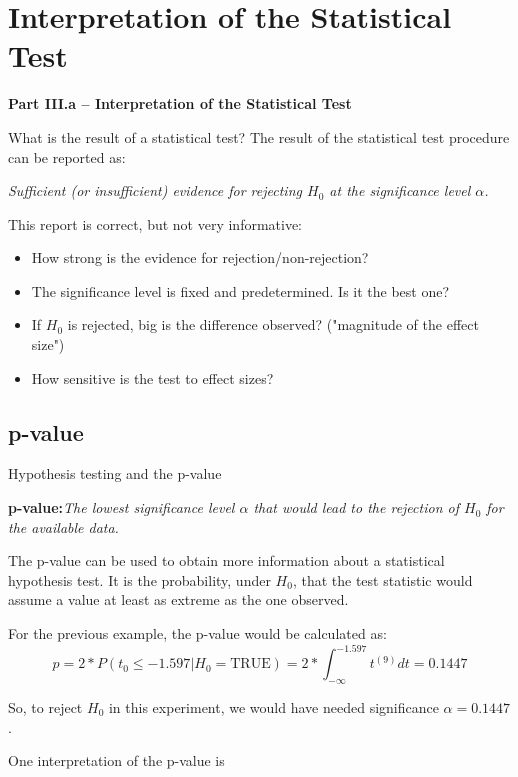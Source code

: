 \section{Interpretation of the Statistical Test}

\begin{frame}
  \begin{center}
    {\bf Part III.a -- Interpretation of the Statistical Test}
  \end{center}
\end{frame}


\begin{frame}{What is the result of a statistical test?}
  The result of the statistical test procedure can be reported as:
  \begin{block}{}
    \begin{center}
      \emph{Sufficient (or insufficient) evidence for rejecting $H_0$ at the significance level $\alpha$.}
    \end{center}
  \end{block}
  \bigskip

  This report is correct, but not very informative:
  \begin{itemize}
    \item How strong is the evidence for rejection/non-rejection?
    \item The significance level is fixed and predetermined. Is it the best one?
    \item If $H_0$ is rejected, big is the difference observed?
      ("magnitude of the effect size")
    \item How sensitive is the test to effect sizes?
  \end{itemize}
\end{frame}

\subsection{p-value}
\begin{frame}{Hypothesis testing and the p-value}
  \begin{block}{}
      {\bf p-value:}\emph{The lowest significance level $\alpha$ that would lead to the rejection of $H_0$ for the available data.}
  \end{block}

  The p-value can be used to obtain more information about a statistical hypothesis test. It is the probability, under $H_0$, that the test statistic would assume a value at least as extreme as the one observed.\bigskip

  For the previous example, the p-value would be calculated as:
  \begin{equation*}
    p = 2*P(t_0 \leq -1.597|H_0 = \text{TRUE}) = 2*\int^{-1.597}_{-\infty}t^{(9)}dt = 0.1447
  \end{equation*}

  So, to reject $H_0$ in this experiment, we would have needed significance $\alpha = 0.1447$.\bigskip

  One interpretation of the p-value is 
\end{frame}

